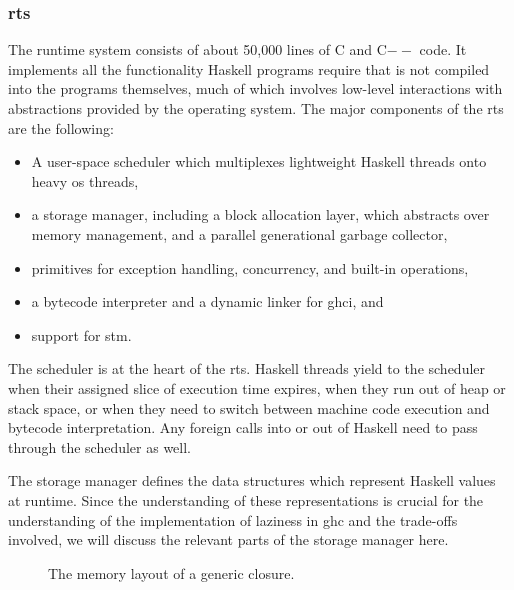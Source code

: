 \documentclass[thesis=B,english]{FITthesis}[2019/12/23]
\begin{document}
\subsubsection*{\acrlong{rts}}
The runtime system consists of about 50,000 lines of C and C$--$ code. It
implements all the functionality Haskell programs require that is not compiled
into the programs themselves, much of which involves low-level interactions
with abstractions provided by the operating system. The major components of the
\acrshort{rts} are the following:
\begin{itemize}
	\item A user-space scheduler which multiplexes lightweight Haskell threads
		onto heavy \acrshort{os} threads,
	\item a storage manager, including a block allocation layer, which
		abstracts over memory management, and a parallel generational garbage
		collector,
	\item primitives for exception handling, concurrency, and built-in
		operations,
	\item a bytecode interpreter and a dynamic linker for \acrshort{ghci}, and
	\item support for \acrfull{stm}.
\end{itemize}

The scheduler is at the heart of the \acrshort{rts}. Haskell threads yield to
the scheduler when their assigned slice of execution time expires, when they
run out of heap or stack space, or when they need to switch between machine
code execution and bytecode interpretation. Any foreign calls into or out of
Haskell need to pass through the scheduler as well.

The storage manager defines the data structures which represent Haskell values
at runtime. Since the understanding of these representations is crucial for the
understanding of the implementation of laziness in \acrshort{ghc} and the
trade-offs involved, we will discuss the relevant parts of the storage manager
here.

\begin{figure}[h]
	\centering
	\caption{The memory layout of a generic closure.}
	\label{fig:closure-layout}
\end{figure}
\end{document}
